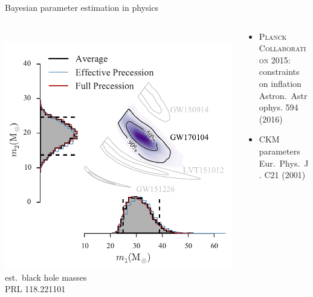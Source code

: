 \documentclass{beamer}
\begin{document}
\begin{frame}{Bayesian parameter estimation in physics}
  \begin{columns}
    \begin{column}{0.4\textwidth}
      \\
      \includegraphics[width=\columnwidth]{ligo} \\
      est.\ black hole masses\\
      {\scriptsize PRL 118.221101}\\
    \end{column}
    \begin{column}{0.6\textwidth}
      \begin{itemize}
        \item {\scshape Planck Collaboration 2015:}\\
          constraints on inflation\\
          {\scriptsize Astron.~Astrophys. 594 (2016)}\\[2ex]
        \item CKM parameters\\
          {\scriptsize Eur.~Phys.~J. C21 (2001)}
      \end{itemize}
    \end{column}
  \end{columns}

\end{frame}
\end{document}
